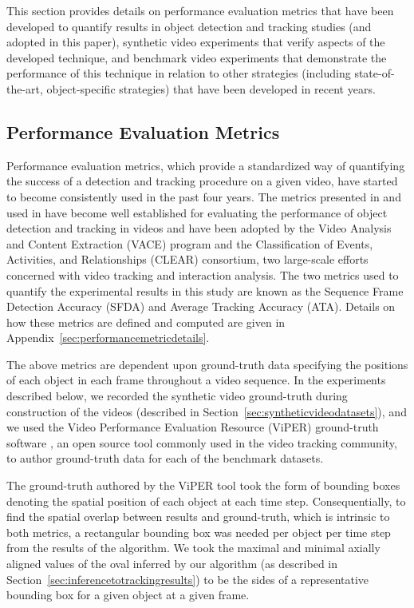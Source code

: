\documentclass[twocolumn, final]{svjour3}
\begin{document}
This section provides details on performance evaluation metrics that have been developed to quantify results in object detection and tracking studies (and adopted in this paper), synthetic video experiments that verify aspects of the developed technique, and benchmark video experiments that demonstrate the performance of this technique in relation to other strategies (including state-of-the-art, object-specific strategies) that have been developed in recent years.   


\subsection{Performance Evaluation Metrics}
\label{sec:performanceevaluationmetrics}

Performance evaluation metrics, which provide a standardized way of quantifying the success of a detection and tracking procedure on a given video, have started to become consistently used in the past four years. The metrics presented in \cite{kasturi_2008} and used in \cite{ellis_2010, taj_2007, lee_2009} have become well established for evaluating the performance of object detection and tracking in videos and have been adopted by the Video Analysis and Content Extraction (VACE) program and the Classification of Events, Activities, and Relationships (CLEAR) consortium, two large-scale efforts concerned with video tracking and interaction analysis. The two metrics used to quantify the experimental results in this study are known as the Sequence Frame Detection Accuracy (SFDA) and Average Tracking Accuracy (ATA). Details on how these metrics are defined and computed are given in Appendix~\ref{sec:performancemetricdetails}.

The above metrics are dependent upon ground-truth data specifying the positions of each object in each frame throughout a video sequence. In the experiments described below, we recorded the synthetic video ground-truth during construction of the videos (described in Section~\ref{sec:syntheticvideodatasets}), and we used the Video Performance Evaluation Resource (ViPER) ground-truth software \cite{doermann_2000}, an open source tool commonly used in the video tracking community, to author ground-truth data for each of the benchmark datasets.

The ground-truth authored by the ViPER tool took the form of bounding boxes denoting the spatial position of each object at each time step. Consequentially, to find the spatial overlap between results and ground-truth, which is intrinsic to both metrics, a rectangular bounding box was needed per object per time step from the results of the algorithm. We took the maximal and minimal axially aligned values of the oval inferred by our algorithm (as described in Section~\ref{sec:inferencetotrackingresults}) to be the sides of a representative bounding box for a given object at a given frame.
\end{document}

